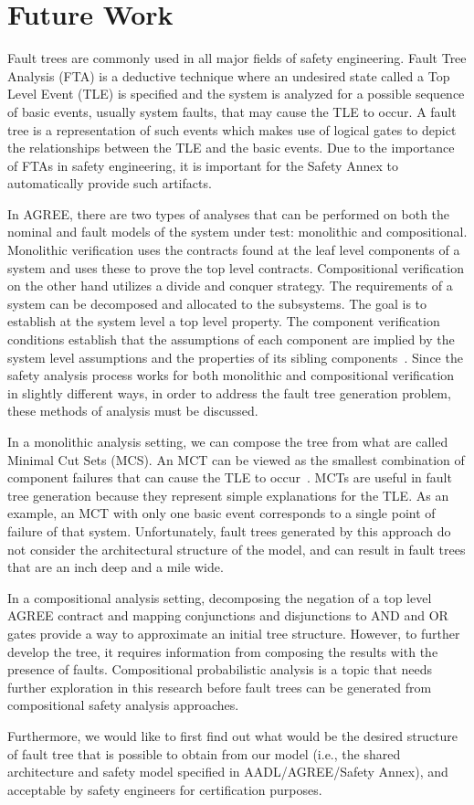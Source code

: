 \section{Future Work}
\label{sec:future_work}

Fault trees are commonly used in all major fields of safety engineering. Fault Tree Analysis (FTA) is a deductive technique where an undesired state called a Top Level Event (TLE) is specified and the system is analyzed for a possible sequence of basic events, usually system faults, that may cause the TLE to occur. A fault tree is a representation of such events which makes use of logical gates to depict the relationships between the TLE and the basic events. Due to the importance of FTAs in safety engineering, it is important for the Safety Annex to automatically provide such artifacts. 

In AGREE, there are two types of analyses that can be performed on both the nominal and fault models of the system under test: monolithic and compositional. Monolithic verification uses the contracts found at the leaf level components of a system and uses these to prove the top level contracts. Compositional verification on the other hand utilizes a divide and conquer strategy. The requirements of a system can be decomposed and allocated to the subsystems. The goal is to establish at the system level a top level property. The component verification conditions establish that the assumptions of each component are implied by the system level assumptions and the properties of its sibling components~\cite{hilt2013:MuWhRaHe,QFCS15:backes,NFM2012:CoGaMiWhLaLu}. Since the safety analysis process works for both monolithic and compositional verification in slightly different ways, in order to address the fault tree generation problem, these methods of analysis must be discussed. 

In a monolithic analysis setting, we can compose the tree from what are called Minimal Cut Sets (MCS). An MCT can be viewed as the smallest combination of component failures that can cause the TLE to occur~\cite{Bozzano:2010:DSA:1951720}. MCTs are useful in fault tree generation because they represent simple explanations for the TLE. As an example, an MCT with only one basic event corresponds to a single point of failure of that system. Unfortunately, fault trees generated by this approach do not consider the architectural structure of the model, and can result in fault trees that are an inch deep and a mile wide. 

In a compositional analysis setting, decomposing the negation of a top level AGREE contract and mapping conjunctions and disjunctions to AND and OR gates provide a way to approximate an initial tree structure. However, to further develop the tree, it requires information from composing the results with the presence of faults. Compositional probabilistic analysis is a topic that needs further exploration in this research before fault trees can be generated from compositional safety analysis approaches. 

Furthermore, we would like to first find out what would be the desired structure of fault tree that is possible to obtain from our model (i.e., the shared architecture and safety model specified in AADL/AGREE/Safety Annex), and acceptable by safety engineers for certification purposes. 
